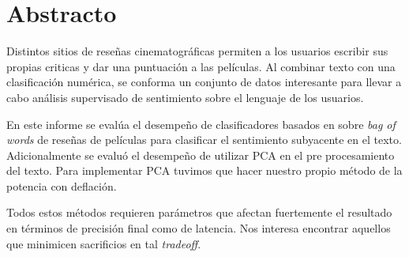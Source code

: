 \section{Abstracto}%
\label{sec:abstracto}

Distintos sitios de reseñas cinematográficas permiten a los usuarios escribir
sus propias criticas y dar una puntuación a las películas.
Al combinar texto con una clasificación numérica, se conforma un conjunto de
datos interesante para llevar a cabo análisis supervisado de sentimiento sobre
el lenguaje de los usuarios.

En este informe se evalúa el desempeño de clasificadores basados en \knn{}
sobre \textit{bag of words} de reseñas de películas para clasificar el
sentimiento subyacente en el texto.
Adicionalmente se evaluó el desempeño de utilizar PCA en el pre
procesamiento del texto.
Para implementar PCA tuvimos que hacer nuestro propio método de la potencia con deflación.

Todos estos métodos requieren parámetros que afectan fuertemente el resultado en
términos de precisión final como de latencia. Nos interesa encontrar aquellos
que minimicen sacrificios en tal \textit{tradeoff}.
